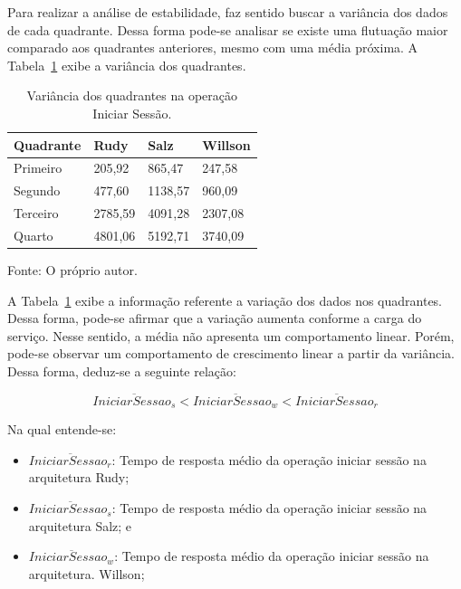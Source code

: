 Para realizar a análise de estabilidade, faz sentido buscar a variância dos dados de cada quadrante.
%
Dessa forma pode-se analisar se existe uma flutuação maior comparado aos quadrantes anteriores, mesmo com uma média próxima.
%
A Tabela~\ref{tab:op_start_session_var} exibe a variância dos quadrantes.


\begin{table}[htb!]
\centering
\begin{adjustbox}{max width=\textwidth}
\caption{Variância dos quadrantes na operação Iniciar Sessão.}
\label{tab:op_start_session_var}
\begin{tabular}{l|l|l|l}

\hline \hline

Quadrante & Rudy    & Salz    & Willson \\ \hline \hline

Primeiro  & 205,92 & 865,47 & 247,58 \\ \hline

Segundo   & 477,60 & 1138,57 & 960,09 \\ \hline

Terceiro  & 2785,59 & 4091,28 & 2307,08 \\ \hline

Quarto    & 4801,06 & 5192,71 & 3740,09 \\ \hline \hline

\end{tabular}

\end{adjustbox}

Fonte: O próprio autor.
\end{table}

A Tabela~\ref{tab:op_start_session_var} exibe a informação referente a variação dos dados nos quadrantes.
%
Dessa forma, pode-se afirmar que a variação aumenta conforme a carga do serviço.
%
Nesse sentido, a média não apresenta um comportamento linear.
%
Porém, pode-se observar um comportamento de crescimento linear a partir da variância.
%
Dessa forma, deduz-se a seguinte relação:

$$
  \overline{IniciarSessao_{s}} < \overline{IniciarSessao_{w}} <\overline{IniciarSessao_{r}}
$$

Na qual entende-se:

\begin{itemize}
 \item $\overline{IniciarSessao_{r}}$: Tempo de resposta médio da operação iniciar sessão na arquitetura Rudy;
 \item $\overline{IniciarSessao_{s}}$: Tempo de resposta médio da operação iniciar sessão na arquitetura Salz; e
 \item $\overline{IniciarSessao_{w}}$: Tempo de resposta médio da operação iniciar sessão na arquitetura. Willson;
\end{itemize}

